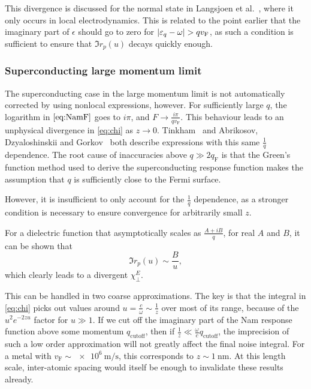 \documentclass[%
 preprint,
 amsmath,amssymb,
 aps,
]{revtex4-2}
\newcommand{\vf}{v_{\mathrm{F}}}
\begin{document}
This divergence is discussed for the normal state in Langsjoen et al.~\cite{QubitRelax}, where it only occurs in local electrodynamics.
This is related to the point earlier that the imaginary part of $\epsilon$ should go to zero for $\abs{\varepsilon_q - \omega} > q \vf$, as such a condition is sufficient to ensure that $\Im r_p(u)$ decays quickly enough.

\subsubsection{Superconducting large momentum limit} \label{subsubsec:scbigq}
The superconducting case in the large momentum limit is not automatically corrected by using nonlocal expressions, however.
For sufficiently large $q$, the logarithm in $\eqref{eq:NamF}$ goes to $i \pi$, and $F \rightarrow \frac{i \pi}{q \vf}$.
This behaviour leads to an unphysical divergence in \eqref{eq:chi} as $z \rightarrow 0$.
Tinkham~\cite{Tinkham} and Abrikosov, Dzyaloshinskii and Gorkov~\cite{AGD} both describe expressions with this same $\frac{1}{q}$ dependence.
The root cause of inaccuracies above $q \gg 2 q_{\mathrm{F}}$ is that the Green's function method used to derive the superconducting response function makes the assumption that $q$ is sufficiently close to the Fermi surface.

However, it is insufficient to only account for the $\frac{1}{q}$ dependence, as a stronger condition is necessary to ensure convergence for arbitrarily small $z$.

For a dielectric function that asymptotically scales as $\frac{A + i B}{q}$, for real $A$ and $B$, it can be shown that
\begin{equation}
	\Im r_p(u) \sim \frac{B}{u},
\end{equation}
which clearly leads to a divergent $\chi_\perp^E$.

This can be handled in two coarse approximations.
The key is that the integral in \eqref{eq:chi} picks out values around $u = \frac{c}{\omega} \sim \frac{1}{z}$ over most of its range, because of the $u^2 e^{-2 z u}$ factor for $u \gg 1$.
If we cut off the imaginary part of the Nam response function above some momentum $q_{\mathrm{cutoff}}$, then if $\frac{1}{z} \ll \frac{\omega}{c} q_{\mathrm{cutoff}}$, the imprecision of such a low order approximation will not greatly affect the final noise integral.
For a metal with $\vf \sim \SI{e6}{\m\per\s}$, this corresponds to $z \sim \SI{1}{\nm}$.
At this length scale, inter-atomic spacing would itself be enough to invalidate these results already.
\end{document}
